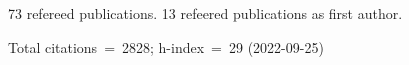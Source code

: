 73 refereed publications. 13 refeered publications as first author.

Total citations~=~2828; h-index~=~29 (2022-09-25)